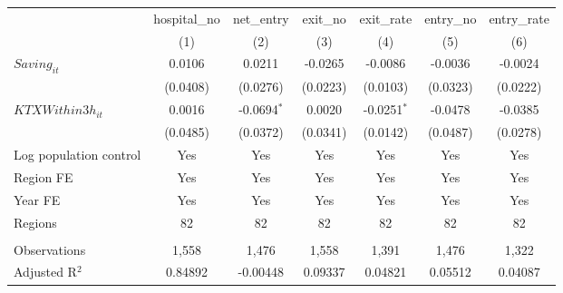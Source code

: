 \begingroup
\centering
\begin{tabular}{lcccccc}
   \toprule
                          & hospital\_no  & net\_entry    & exit\_no  & exit\_rate    & entry\_no  & entry\_rate \\    
                          & (1)           & (2)           & (3)       & (4)           & (5)        & (6)\\  
   \midrule 
   $Saving_{it}$          & 0.0106        & 0.0211        & -0.0265   & -0.0086       & -0.0036    & -0.0024\\   
                          & (0.0408)      & (0.0276)      & (0.0223)  & (0.0103)      & (0.0323)   & (0.0222)\\   
   $KTXWithin3h_{it}$     & 0.0016        & -0.0694$^{*}$ & 0.0020    & -0.0251$^{*}$ & -0.0478    & -0.0385\\   
                          & (0.0485)      & (0.0372)      & (0.0341)  & (0.0142)      & (0.0487)   & (0.0278)\\   
   Log population control & Yes           & Yes           & Yes       & Yes           & Yes        & Yes\\  
   Region FE              & Yes           & Yes           & Yes       & Yes           & Yes        & Yes\\  
   Year FE                & Yes           & Yes           & Yes       & Yes           & Yes        & Yes\\  
   Regions                & 82            & 82            & 82        & 82            & 82         & 82\\  
    \\
   Observations           & 1,558         & 1,476         & 1,558     & 1,391         & 1,476      & 1,322\\  
   Adjusted R$^2$         & 0.84892       & -0.00448      & 0.09337   & 0.04821       & 0.05512    & 0.04087\\  
   \bottomrule
\end{tabular}
\par\endgroup
